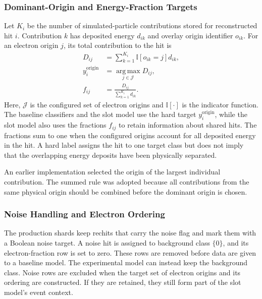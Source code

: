 \subsubsection{Dominant-Origin and Energy-Fraction Targets}

Let \(K_i\) be the number of simulated-particle contributions stored for
reconstructed hit \(i\). Contribution \(k\) has deposited energy \(d_{ik}\)
and overlay origin identifier \(o_{ik}\). For an electron origin \(j\), its
total contribution to the hit is
\begin{align}
    D_{ij}
    &=
    \sum_{k=1}^{K_i}
    \mathbb{I}\!\left[o_{ik}=j\right]d_{ik}, \\
    y_i^{\mathrm{origin}}
    &=
    \operatorname*{arg\,max}_{j\in\mathcal{J}}D_{ij},
    \label{eq:dominant_origin_target}\\
    f_{ij}
    &=
    \frac{D_{ij}}{\sum_{k=1}^{K_i}d_{ik}} .
    \label{eq:origin_fraction_target}
\end{align}
Here, \(\mathcal{J}\) is the configured set of electron origins and
\(\mathbb{I}[\cdot]\) is the indicator function. The baseline classifiers and
the slot model use the hard target \(y_i^{\mathrm{origin}}\), while the slot
model also uses the fractions \(f_{ij}\) to retain information about shared
hits. The fractions sum to one when the configured origins account for all
deposited energy in the hit. A hard label assigns the hit to one target class
but does not imply that the overlapping energy deposits have been physically
separated.

An earlier implementation selected the origin of the largest individual
contribution. The summed rule was adopted because all contributions from the
same physical origin should be combined before the dominant origin is chosen.

\subsubsection{Noise Handling and Electron Ordering}

The production shards keep \gls{rechit}s that carry the noise flag and mark them
with a Boolean noise target. A noise hit is assigned to background class
\(\{0\}\), and its electron-fraction row is set to zero. These rows are removed
before data are given to a baseline model. The experimental model can instead keep
the background class. Noise rows are excluded when the target set of electron
origins and its ordering are constructed. If they are retained, they still
form part of the slot model's event context.

